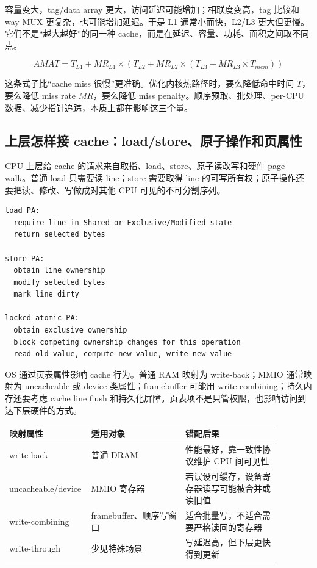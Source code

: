 容量变大，tag/data array 更大，访问延迟可能增加；相联度变高，tag 比较和 way MUX 更复杂，也可能增加延迟。于是 L1 通常小而快，L2/L3 更大但更慢。它们不是“越大越好”的同一种 cache，而是在延迟、容量、功耗、面积之间取不同点。

\[
AMAT = T_{L1} + MR_{L1}\times(T_{L2}+MR_{L2}\times(T_{L3}+MR_{L3}\times T_{mem}))
\]

这条式子比“cache miss 很慢”更准确。优化内核热路径时，要么降低命中时间 \(T\)，要么降低 miss rate \(MR\)，要么降低 miss penalty。顺序预取、批处理、per-CPU 数据、减少指针追踪，本质上都在影响这三个量。

\subsection{上层怎样接 cache：load/store、原子操作和页属性}

CPU 上层给 cache 的请求来自取指、load、store、原子读改写和硬件 page walk。普通 load 只需要读 line；store 需要取得 line 的可写所有权；原子操作还要把读、修改、写做成对其他 CPU 可见的不可分割序列。

\begin{lstlisting}
load PA:
  require line in Shared or Exclusive/Modified state
  return selected bytes

store PA:
  obtain line ownership
  modify selected bytes
  mark line dirty

locked atomic PA:
  obtain exclusive ownership
  block competing ownership changes for this operation
  read old value, compute new value, write new value
\end{lstlisting}

OS 通过页表属性影响 cache 行为。普通 RAM 映射为 write-back；MMIO 通常映射为 uncacheable 或 device 类属性；framebuffer 可能用 write-combining；持久内存还要考虑 cache line flush 和持久化屏障。页表项不是只管权限，也影响访问到达下层硬件的方式。

\begin{longtable}{p{0.20\linewidth}p{0.34\linewidth}p{0.34\linewidth}}
\toprule
映射属性 & 适用对象 & 错配后果 \\
\midrule
write-back & 普通 DRAM & 性能最好，靠一致性协议维护 CPU 间可见性 \\
uncacheable/device & MMIO 寄存器 & 若误设可缓存，设备寄存器读写可能被合并或读旧值 \\
write-combining & framebuffer、顺序写窗口 & 适合批量写，不适合需要严格读回的寄存器 \\
write-through & 少见特殊场景 & 写延迟高，但下层更快得到更新 \\
\bottomrule
\end{longtable}

